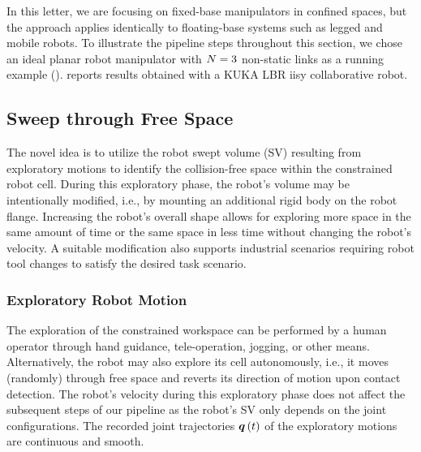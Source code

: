 In this letter,
we are focusing on fixed-base manipulators in confined spaces, 
but the approach applies identically to floating-base systems such as legged and mobile robots.
To illustrate the pipeline steps throughout this section,
we chose an ideal planar robot manipulator with ${N}=3$ non-static links as a running example (). 
 reports results obtained with a KUKA LBR iisy collaborative robot. %

\subsection{Sweep through Free Space} %
\label{subsec:sweepFreeSpace}
The novel idea is to utilize the robot swept volume (SV) resulting from exploratory motions 
to identify the collision-free space within the constrained robot cell.
During this exploratory phase, 
the robot's volume may be intentionally modified, 
i.e., 
by mounting an additional rigid body on the robot flange.
Increasing the robot's overall shape allows for exploring more space in the same amount of time 
or the same space in less time without changing the robot's velocity.
A suitable modification also supports industrial scenarios requiring robot tool changes to satisfy the desired task scenario.

\subsubsection{Exploratory Robot Motion}
The exploration of the constrained workspace can be performed by a human operator through hand guidance, tele-operation, jogging, or other means.
Alternatively,
the robot may also explore its cell autonomously,
i.e., 
it moves (randomly) through free space and reverts its direction of motion upon contact detection.
The robot's velocity during this exploratory phase does not affect the subsequent steps of our pipeline 
as the robot's SV only depends on the joint configurations. 
The recorded joint trajectories ${\bm{q}\left( t \right)}$ %
of the exploratory motions are continuous and smooth. %


